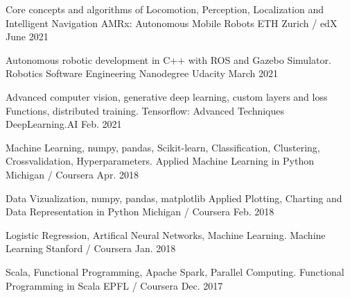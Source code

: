 

\begin{cventries}

    \course
    {Core concepts and algorithms of Locomotion, Perception, Localization and Intelligent Navigation} %
    {AMRx: Autonomous Mobile Robots} %
    {ETH Zurich / edX} %
    {June 2021} %
    {}

    \course
    {Autonomous robotic development in C++ with ROS and Gazebo Simulator.} %
    {Robotics Software Engineering Nanodegree} %
    {Udacity} %
    {March 2021} %
    {}

    \course
    {Advanced computer vision, generative deep learning, custom layers and loss Functions, distributed training.} %
    {Tensorflow: Advanced Techniques} %
    {DeepLearning.AI} %
    {Feb. 2021} %
    {}

    \course
    {Machine Learning, numpy, pandas, Scikit-learn, Classification, Clustering, Crossvalidation, Hyperparameters.} %
    {Applied Machine Learning in Python} %
    {Michigan / Coursera} %
    {Apr. 2018} %
    {}

   \course
   {Data Vizualization, numpy, pandas, matplotlib} %
   {Applied Plotting, Charting and Data Representation in Python} %
   {Michigan / Coursera} %
   {Feb. 2018} %
   {}

    \course
    {Logistic Regression, Artifical Neural Networks, Machine Learning.} %
    {Machine Learning} %
    {Stanford / Coursera} %
    {Jan. 2018} %
    {}

    \course
    {Scala, Functional Programming, Apache Spark, Parallel Computing.} %
    {Functional Programming in Scala} %
    {EPFL / Coursera} %
    {Dec. 2017} %
    {}

\end{cventries}